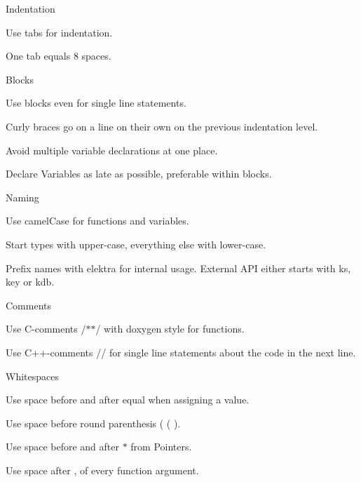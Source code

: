 \begin{DoxyItemize}
\item Indentation
\begin{DoxyItemize}
\item Use tabs for indentation.
\item One tab equals 8 spaces.
\end{DoxyItemize}
\item Blocks
\begin{DoxyItemize}
\item Use blocks even for single line statements.
\item Curly braces go on a line on their own on the previous indentation level.
\item Avoid multiple variable declarations at one place.
\item Declare Variables as late as possible, preferable within blocks.
\end{DoxyItemize}
\item Naming
\begin{DoxyItemize}
\item Use camel\+Case for functions and variables.
\item Start types with upper-\/case, everything else with lower-\/case.
\item Prefix names with {\ttfamily elektra} for internal usage. External A\+P\+I either starts with {\ttfamily ks}, {\ttfamily key} or {\ttfamily kdb}.
\end{DoxyItemize}
\item Comments
\begin{DoxyItemize}
\item Use C-\/comments {\ttfamily /$\ast$$\ast$/} with doxygen style for functions.
\item Use C++-\/comments {\ttfamily //} for single line statements about the code in the next line.
\end{DoxyItemize}
\item Whitespaces
\begin{DoxyItemize}
\item Use space before and after equal when assigning a value.
\item Use space before round parenthesis ( {\ttfamily (} ).
\item Use space before and after {\ttfamily $\ast$} from Pointers.
\item Use space after {\ttfamily ,} of every function argument.
\end{DoxyItemize}
\end{DoxyItemize}

